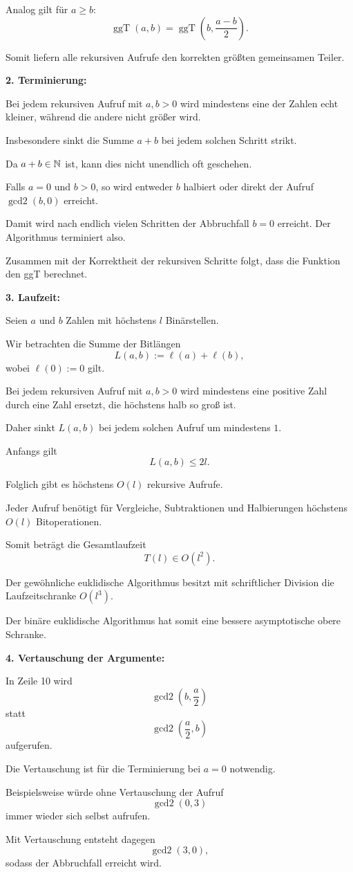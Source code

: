 \documentclass{report}
\begin{document}
\begin{myproof}
  Analog gilt für $a\ge b$:
  \[
    \operatorname{ggT}(a,b)
    =\operatorname{ggT}\left(
      b,\frac{a-b}{2}
    \right).
  \]

  Somit liefern alle rekursiven Aufrufe
  den korrekten größten gemeinsamen Teiler.

  \medskip
  \textbf{2. Terminierung:}

  Bei jedem rekursiven Aufruf mit
  $a,b>0$ wird mindestens eine der Zahlen
  echt kleiner, während die andere
  nicht größer wird.

  Insbesondere sinkt die Summe $a+b$
  bei jedem solchen Schritt strikt.

  Da $a+b\in\mathbb{N}$ ist, kann dies
  nicht unendlich oft geschehen.

  Falls $a=0$ und $b>0$, so wird
  entweder $b$ halbiert oder direkt
  der Aufruf $\operatorname{gcd2}(b,0)$
  erreicht.

  Damit wird nach endlich vielen Schritten
  der Abbruchfall $b=0$ erreicht.
  Der Algorithmus terminiert also.

  Zusammen mit der Korrektheit der
  rekursiven Schritte folgt, dass
  die Funktion den ggT berechnet.

  \medskip
  \textbf{3. Laufzeit:}

  Seien $a$ und $b$ Zahlen mit höchstens
  $l$ Binärstellen.

  Wir betrachten die Summe der Bitlängen
  \[
    L(a,b):=\ell(a)+\ell(b),
  \]
  wobei $\ell(0):=0$ gilt.

  Bei jedem rekursiven Aufruf mit
  $a,b>0$ wird mindestens eine positive
  Zahl durch eine Zahl ersetzt, die
  höchstens halb so groß ist.

  Daher sinkt $L(a,b)$ bei jedem
  solchen Aufruf um mindestens $1$.

  Anfangs gilt
  \[
    L(a,b)\le2l.
  \]

  Folglich gibt es höchstens $O(l)$
  rekursive Aufrufe.

  Jeder Aufruf benötigt für Vergleiche,
  Subtraktionen und Halbierungen höchstens
  $O(l)$ Bitoperationen.

  Somit beträgt die Gesamtlaufzeit
  \[
    \boxed{T(l)\in O(l^2).}
  \]

  Der gewöhnliche euklidische Algorithmus
  besitzt mit schriftlicher Division die
  Laufzeitschranke $O(l^3)$.

  Der binäre euklidische Algorithmus
  hat somit eine bessere asymptotische
  obere Schranke.

  \medskip
  \textbf{4. Vertauschung der Argumente:}

  In Zeile 10 wird
  \[
    \operatorname{gcd2}\left(b,\frac a2\right)
  \]
  statt
  \[
    \operatorname{gcd2}\left(\frac a2,b\right)
  \]
  aufgerufen.

  Die Vertauschung ist für die
  Terminierung bei $a=0$ notwendig.

  Beispielsweise würde ohne Vertauschung
  der Aufruf
  \[
    \operatorname{gcd2}(0,3)
  \]
  immer wieder sich selbst aufrufen.

  Mit Vertauschung entsteht dagegen
  \[
    \operatorname{gcd2}(3,0),
  \]
  sodass der Abbruchfall erreicht wird.
\end{myproof}
\end{document}
